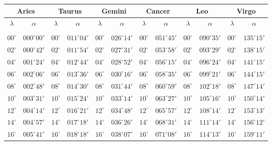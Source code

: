 \clearpage
\begin{table}[!h]
\vspace{0.25cm}
\centering
{\scriptsize \begin{tabular}{cc|cc|cc|cc|cc|cc}
\multicolumn{2}{c}{Aries}\vline & \multicolumn{2}{c}{Taurus} \vline& \multicolumn{2}{c}{Gemini} \vline& \multicolumn{2}{c}{Cancer}\vline &
\multicolumn{2}{c}{Leo}\vline & \multicolumn{2}{c}{Virgo}\\\hline
$\lambda$& $\alpha$& $\lambda$& $\alpha$& $\lambda$& $\alpha$& $\lambda$& $\alpha$& $\lambda$& $\alpha$& $\lambda$& $\alpha$\\\hline
&&&&&&&&&&&\\[-2ex]
$00^\circ$ & $000^\circ00'$ & $00^\circ$ & $011^\circ04'$ & $00^\circ$ & $026^\circ14'$ & $00^\circ$ & $051^\circ45'$ & $00^\circ$ & $090^\circ35'$ & $00^\circ$ & $135^\circ15'$\\
$02^\circ$ & $000^\circ42'$ & $02^\circ$ & $011^\circ54'$ & $02^\circ$ & $027^\circ31'$ & $02^\circ$ & $053^\circ58'$ & $02^\circ$ & $093^\circ29'$ & $02^\circ$ & $138^\circ15'$\\
$04^\circ$ & $001^\circ24'$ & $04^\circ$ & $012^\circ44'$ & $04^\circ$ & $028^\circ52'$ & $04^\circ$ & $056^\circ15'$ & $04^\circ$ & $096^\circ24'$ & $04^\circ$ & $141^\circ15'$\\
$06^\circ$ & $002^\circ06'$ & $06^\circ$ & $013^\circ36'$ & $06^\circ$ & $030^\circ16'$ & $06^\circ$ & $058^\circ35'$ & $06^\circ$ & $099^\circ21'$ & $06^\circ$ & $144^\circ15'$\\
$08^\circ$ & $002^\circ48'$ & $08^\circ$ & $014^\circ30'$ & $08^\circ$ & $031^\circ44'$ & $08^\circ$ & $060^\circ59'$ & $08^\circ$ & $102^\circ18'$ & $08^\circ$ & $147^\circ14'$\\
$10^\circ$ & $003^\circ31'$ & $10^\circ$ & $015^\circ24'$ & $10^\circ$ & $033^\circ14'$ & $10^\circ$ & $063^\circ27'$ & $10^\circ$ & $105^\circ16'$ & $10^\circ$ & $150^\circ14'$\\
$12^\circ$ & $004^\circ14'$ & $12^\circ$ & $016^\circ21'$ & $12^\circ$ & $034^\circ48'$ & $12^\circ$ & $065^\circ57'$ & $12^\circ$ & $108^\circ14'$ & $12^\circ$ & $153^\circ13'$\\
$14^\circ$ & $004^\circ57'$ & $14^\circ$ & $017^\circ18'$ & $14^\circ$ & $036^\circ26'$ & $14^\circ$ & $068^\circ31'$ & $14^\circ$ & $111^\circ14'$ & $14^\circ$ & $156^\circ12'$\\
$16^\circ$ & $005^\circ41'$ & $16^\circ$ & $018^\circ18'$ & $16^\circ$ & $038^\circ07'$ & $16^\circ$ & $071^\circ08'$ & $16^\circ$ & $114^\circ13'$ & $16^\circ$ & $159^\circ11'$\\

\end{tabular}}
\end{table}
